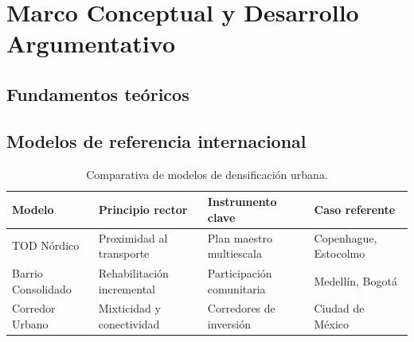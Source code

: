 
\section{Marco Conceptual y Desarrollo Argumentativo}

\subsection{Fundamentos teóricos}

\lipsum[5]


\lipsum[6]

\subsection{Modelos de referencia internacional}

\lipsum[7-8]

\begin{table}[ht]
\centering
\caption{Comparativa de modelos de densificación urbana.}
\label{tab:modelos}
\begin{tabularx}{\textwidth}{@{} l X X X @{}}
\toprule
\textbf{Modelo}    & \textbf{Principio rector} & \textbf{Instrumento clave} & \textbf{Caso referente} \\
\midrule
\rowcolor{ColorFondoTabla}
TOD Nórdico        & Proximidad al transporte  & Plan maestro multiescala  & Copenhague, Estocolmo \\
Barrio Consolidado & Rehabilitación incremental& Participación comunitaria & Medellín, Bogotá \\
\rowcolor{ColorFondoTabla}
Corredor Urbano    & Mixticidad y conectividad & Corredores de inversión   & Ciudad de México \\
\bottomrule
\end{tabularx}
\end{table}

